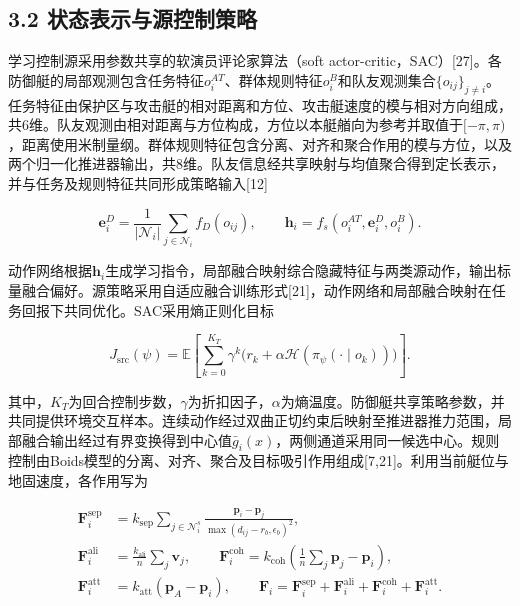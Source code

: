 \documentclass[UTF8,a4paper,zihao=5,fontset=none]{ctexart}
\begin{document}
\subsection*{3.2 状态表示与源控制策略}

学习控制源采用参数共享的软演员评论家算法（soft actor-critic，SAC）{[}27{]}。各防御艇的局部观测包含任务特征\(o_i^{AT}\)、群体规则特征\(o_i^B\)和队友观测集合\(\{o_{ij}\}_{j\ne i}\)。任务特征由保护区与攻击艇的相对距离和方位、攻击艇速度的模与相对方向组成，共6维。队友观测由相对距离与方位构成，方位以本艇艏向为参考并取值于\([-\pi,\pi)\)，距离使用米制量纲。群体规则特征包含分离、对齐和聚合作用的模与方位，以及两个归一化推进器输出，共8维。队友信息经共享映射与均值聚合得到定长表示，并与任务及规则特征共同形成策略输入{[}12{]}

\[
\boldsymbol e_i^D=\frac1{|\mathcal N_i|}\sum_{j\in\mathcal N_i}f_D(o_{ij}),
\qquad
\boldsymbol h_i=f_s(o_i^{AT},\boldsymbol e_i^D,o_i^B).
\tag{8}
\]

动作网络根据\(\boldsymbol h_i\)生成学习指令，局部融合映射综合隐藏特征与两类源动作，输出标量融合偏好。源策略采用自适应融合训练形式{[}21{]}，动作网络和局部融合映射在任务回报下共同优化。SAC采用熵正则化目标

\[
J_{\mathrm{src}}(\psi)
=\mathbb E\!\left[\sum_{k=0}^{K_T}\gamma^k
\bigl(r_k+\alpha\mathcal H(\pi_\psi(\cdot\mid o_k))\bigr)\right].
\tag{9}
\]

其中，\(K_T\)为回合控制步数，\(\gamma\)为折扣因子，\(\alpha\)为熵温度。防御艇共享策略参数，并共同提供环境交互样本。连续动作经过双曲正切约束后映射至推进器推力范围，局部融合输出经过有界变换得到中心值\(\bar g_i(x)\)，两侧通道采用同一候选中心。规则控制由Boids模型的分离、对齐、聚合及目标吸引作用组成{[}7,21{]}。利用当前艇位与地固速度，各作用写为

\[
\begin{aligned}
\boldsymbol F_i^{\mathrm{sep}}&=
 k_{\mathrm{sep}}\sum_{j\in\mathcal N_i^s}
 \frac{\boldsymbol p_i-\boldsymbol p_j}{\max(d_{ij}-r_b,\epsilon_b)^2},\\
\boldsymbol F_i^{\mathrm{ali}}&=\frac{k_{\mathrm{ali}}}{n}\sum_j\boldsymbol v_j,
\qquad
\boldsymbol F_i^{\mathrm{coh}}=k_{\mathrm{coh}}\left(\frac1n\sum_j\boldsymbol p_j-\boldsymbol p_i\right),\\
\boldsymbol F_i^{\mathrm{att}}&=k_{\mathrm{att}}(\boldsymbol p_A-\boldsymbol p_i),
\qquad
\boldsymbol F_i=\boldsymbol F_i^{\mathrm{sep}}+\boldsymbol F_i^{\mathrm{ali}}+
\boldsymbol F_i^{\mathrm{coh}}+\boldsymbol F_i^{\mathrm{att}}.
\end{aligned}
\tag{10}
\]
\end{document}

